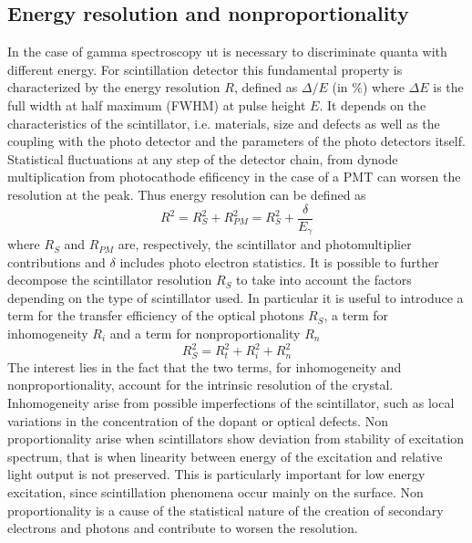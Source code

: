 \subsection{Energy resolution and nonproportionality}
In the case of gamma spectroscopy ut is necessary to discriminate quanta with different energy.
For scintillation detector this fundamental property is characterized by the energy resolution $R$, defined as $\Delta /E$ (in $\%$) where $\Delta E$ is the full width at half maximum (FWHM) at pulse height $E$.
It depends on the characteristics of the scintillator, i.e. materials, size and defects as well as the coupling with the photo detector and the parameters of the photo detectors itself. Statistical fluctuations at any step of the detector chain, from dynode multiplication from photocathode efificency in the case of a PMT can worsen the resolution at the peak. Thus energy resolution can be defined as\cite{Rodnyi1997}
\begin{equation}
R^{2} = R_{S}^{2} + R_{PM}^{2} = R_{S}^{2} + \frac{\delta}{E_{\gamma}}
\end{equation}
where $R_{S}$ and $R_{PM}$ are, respectively, the scintillator and photomultiplier contributions and $\delta$ includes photo electron statistics.
It is possible to further decompose the scintillator resolution $R_{S}$ to take into account the factors depending on the type of scintillator used. In particular it is useful to introduce a term for the transfer efficiency of the optical photons $R_{S}$, a term for inhomogeneity $R_{i}$ and a term for nonproportionality $R_{n}$
\begin{equation}
R_{S}^{2} = R_{t}^{2} + R_{i}^{2} + R_{n}^{2}
\end{equation}
The interest lies in the fact that the two terms, for inhomogeneity and nonproportionality, account for the intrinsic resolution of the crystal.
Inhomogeneity arise from possible imperfections of the scintillator, such as local variations in the concentration of the dopant or optical defects.
Non proportionality arise when scintillators show deviation from stability of excitation spectrum, that is when linearity between energy of the excitation and relative light output is not preserved. This is particularly important for low energy excitation, since scintillation phenomena occur mainly on the surface. Non proportionality is a cause of the statistical nature of the creation of secondary electrons and photons and contribute to worsen the resolution.

